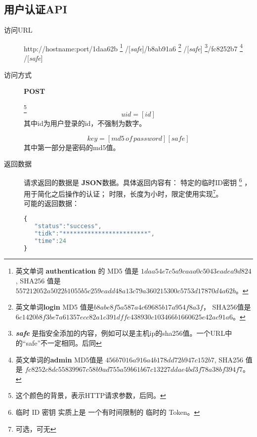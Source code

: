 \documentclass[UTF8]{article}
\def\safe{/[\textit{safe}]}
\def\POST{\colorbox[rgb]{0.77,0.53,0.97}{\textbf{POST}}}
\def\bfJSON{\textbf{JSON}\space}
\def\viaurl{\item[{\quad\colorbox[rgb]{0.47,0.88,0.89}{访问URL}}]}
\def\viareq#1{\item[{\quad\colorbox[rgb]{0.57,0.88,0.99}{访问方式}}] #1}
\def\rtdata{\item[{\quad\colorbox[rgb]{0.70,0.9,0.59}{返回数据}}]}
\begin{document}


    \subsection{用户认证API}%



    \begin{description}

        \viaurl http://hostname:port/1daa62b
        \footnote{
            英文单词 \textbf{authentication} 的
            MD5 值是
            $1daa54e7c5a9caaa0c5043eadea9d824$,
            SHA256 值是
            $557212052a5022b1055b5c259eadd48a13c79a360215300c5753d17870d4a62b$。
        }
        \safe/b8ab91a6
        \footnote{
            英文单词\textbf{login}  MD5 值是$b8abe8f5a587a4c69685b17a954f8a3f$，
            SHA256值是
            $6c1420b8f3be7a61357ecc82a1c391dffe438930c103466b1660625e42ac91a6$。
        }
        \safe
        \footnote{\textit{\textbf{safe}} 是指安全添加的内容，例如可以是主机ip的sha256值。一个URL中的“safe”不一定相同。后同}/fc8252b7
        \footnote{
            英文单词的\textbf{admin}
            MD5值是 $456b7016a916a4b178dd72b947c152b7 $,
            SHA256 值是
            $fc8252c8dc55839967c58b9ad755a59b61b67c13227ddae4bd3f78a38bf394f7$。
        }
        \safe

        \viareq \POST

        \label{par:id}
        \footnote{这个颜色的背景，表示HTTP请求参数，后同。}
        $$uid=[id]$$
        其中id为用户登录的id，不强制为数字。

        \label{par:key}
         $$key=[md5\, of\, password][safe]$$
         其中第一部分是密码的md5值。

        \rtdata 请求返回的数据是 \bfJSON 数据。具体返回内容有：
        特定的临时ID密钥 
        \footnote{临时 ID 密钥 实质上是 一个有时间限制的 临时的 Token。}
        ，用于简化之后操作的认证；
        时限，长度为小时，限定使用实现\footnote{可选，可无}。
         \\ 可能的返回数据：
        \begin{lstlisting}[language=JavaScript]
{
   "status":"success",
   "tidk":"************************",
   "time":24
}
        \end{lstlisting}


    \end{description}
\end{document}
